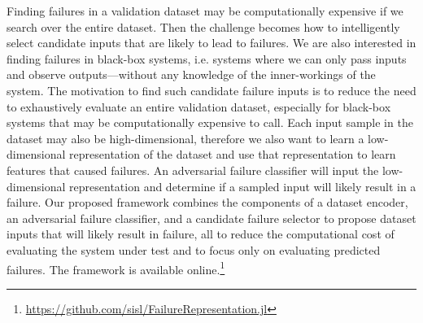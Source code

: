 Finding failures in a validation dataset may be computationally expensive if we search over the entire dataset.
Then the challenge becomes how to intelligently select candidate inputs that are likely to lead to failures.
We are also interested in finding failures in black-box systems, i.e. systems where we can only pass inputs and observe outputs---without any knowledge of the inner-workings of the system.
The motivation to find such candidate failure inputs is to reduce the need to exhaustively evaluate an entire validation dataset, especially for black-box systems that may be computationally expensive to call.
Each input sample in the dataset may also be high-dimensional, therefore we also want to learn a low-dimensional representation of the dataset and use that representation to learn features that caused failures.
An adversarial failure classifier will input the low-dimensional representation and determine if a sampled input will likely result in a failure.
Our proposed framework combines the components of a dataset encoder, an adversarial failure classifier, and a candidate failure selector to propose dataset inputs that will likely result in failure, all to reduce the computational cost of evaluating the system under test and to focus only on evaluating predicted failures.
The framework is available online.\footnote{\url{https://github.com/sisl/FailureRepresentation.jl}}

